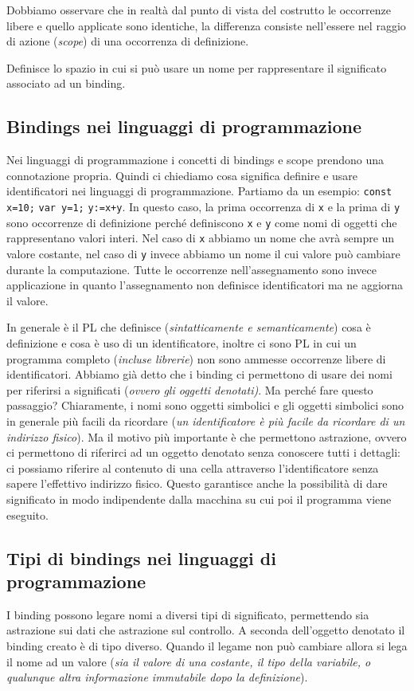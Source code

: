 \documentclass[oneside,a4paper,11pt]{book}
\theoremstyle{italicstyle}
\theoremstyle{normStyle}
\begin{document}
Dobbiamo osservare che in realtà dal punto di vista del costrutto le occorrenze libere e quello applicate 
sono identiche, la differenza consiste nell'essere nel raggio di azione (\textit{scope}) di una occorrenza 
di definizione.
\begin{tcolorbox}[title={Scope di un binding}]
Definisce lo spazio in cui si può usare un nome per rappresentare il significato associato 
ad un binding.
\end{tcolorbox}
\subsection{Bindings nei linguaggi di programmazione}
Nei linguaggi di programmazione i concetti di bindings e scope prendono una connotazione 
propria. Quindi ci chiediamo cosa significa definire e usare identificatori nei linguaggi 
di programmazione. Partiamo da un esempio: \verb|const x=10;| \verb|var y=1;| \verb|y:=x+y|.
In questo caso, la prima occorrenza di \verb|x| e la prima di \verb|y| sono occorrenze 
di definizione perché definiscono \verb|x| e \verb|y| come nomi di 
oggetti che rappresentano valori interi.
Nel caso di \verb|x| abbiamo un nome che avrà sempre un valore costante,
nel caso di \verb|y| invece abbiamo un nome il cui valore può cambiare 
durante la computazione. Tutte le occorrenze nell'assegnamento sono invece 
applicazione in quanto l'assegnamento non definisce identificatori ma ne aggiorna 
il valore.

In generale è il PL che definisce (\textit{sintatticamente e semanticamente}) cosa è 
definizione e cosa è uso di un identificatore, inoltre ci sono PL in cui un programma 
completo (\textit{incluse librerie}) non sono ammesse occorrenze libere di identificatori.
Abbiamo già detto che i binding ci permettono di usare dei nomi per riferirsi a significati
(\textit{ovvero gli oggetti denotati)}. Ma perché fare questo
passaggio? Chiaramente, i nomi sono oggetti simbolici e gli 
oggetti simbolici sono in generale più facili da ricordare 
(\textit{un identificatore è più facile da ricordare di un indirizzo
fisico}). Ma il motivo più importante è che permettono
astrazione, ovvero ci permettono di riferirci ad un oggetto
denotato senza conoscere tutti i dettagli: ci possiamo
riferire al contenuto di una cella attraverso l’identificatore
senza sapere l’effettivo indirizzo fisico. Questo garantisce
anche la possibilità di dare significato in modo indipendente
dalla macchina su cui poi il programma viene eseguito.
\subsection{Tipi di bindings nei linguaggi di programmazione}
I binding possono legare nomi a diversi tipi di significato, 
permettendo sia astrazione sui dati che astrazione sul controllo.
A seconda dell'oggetto denotato il binding creato è di tipo diverso. Quando 
il legame non può cambiare allora si lega il nome ad un valore (\textit{sia 
il valore di una costante, il tipo della variabile, o qualunque altra informazione 
immutabile dopo la definizione}).
\end{document}
